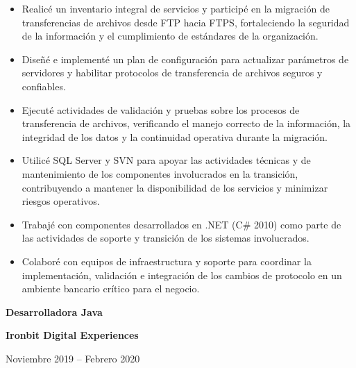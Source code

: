 \documentclass[10pt,letterpaper]{article}
\newcommand{\jobtitle}[1]{
    {\bfseries #1}
}
\newcommand{\company}[1]{
    {\bfseries\color{DarkGray} #1}
}
\newcommand{\jobdate}[1]{
    {\color{MediumGray} #1}
}
\begin{document}
\begin{itemize}

\item Realicé un inventario integral de servicios y participé en la migración de transferencias de archivos desde FTP hacia FTPS, fortaleciendo la seguridad de la información y el cumplimiento de estándares de la organización.

\item Diseñé e implementé un plan de configuración para actualizar parámetros de servidores y habilitar protocolos de transferencia de archivos seguros y confiables.

\item Ejecuté actividades de validación y pruebas sobre los procesos de transferencia de archivos, verificando el manejo correcto de la información, la integridad de los datos y la continuidad operativa durante la migración.

\item Utilicé SQL Server y SVN para apoyar las actividades técnicas y de mantenimiento de los componentes involucrados en la transición, contribuyendo a mantener la disponibilidad de los servicios y minimizar riesgos operativos.

\item Trabajé con componentes desarrollados en .NET (C\# 2010) como parte de las actividades de soporte y transición de los sistemas involucrados.

\item Colaboré con equipos de infraestructura y soporte para coordinar la implementación, validación e integración de los cambios de protocolo en un ambiente bancario crítico para el negocio.

\end{itemize}

\jobtitle{Desarrolladora Java} \textbar{}
\company{Ironbit Digital Experiences}
\hfill \textbar{}
\jobdate{Noviembre 2019 -- Febrero 2020}
\end{document}
